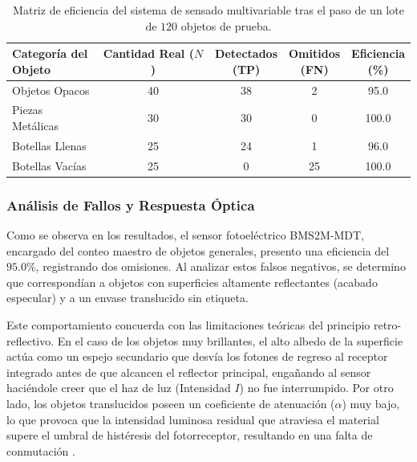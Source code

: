 \documentclass[conference]{IEEEtran}
\begin{document}
\begin{table}[htbp]
    \centering
    \caption{Matriz de eficiencia del sistema de sensado multivariable tras el paso de un lote de $120$ objetos de prueba.}
    \label{tab:matriz_eficiencia}
    \begin{tabular}{lcccc}
        \hline
        \makecell{Categoría del\\Objeto} & \makecell{Cantidad Real\\($N$)} & \makecell{Detectados\\(TP)} & \makecell{Omitidos\\(FN)} & \makecell{Eficiencia\\(\%)} \\
        \hline
        Objetos Opacos & 40 & 38 & 2 & 95.0 \\
        Piezas Metálicas & 30 & 30 & 0 & 100.0 \\
        Botellas Llenas & 25 & 24 & 1 & 96.0 \\
        Botellas Vacías & 25 & 0 & 25 & 100.0\\
        \hline
    \end{tabular}
\end{table}

\subsubsection{Análisis de Fallos y Respuesta Óptica}
Como se observa en los resultados, el sensor fotoeléctrico  BMS2M-MDT, encargado del conteo maestro de objetos generales, presento una eficiencia del $95.0\%$, registrando dos omisiones. Al analizar estos falsos negativos, se determino que correspondían a objetos con superficies altamente reflectantes (acabado especular) y a un envase translucido sin etiqueta. 

Este comportamiento concuerda con las limitaciones teóricas del principio retro-reflectivo. En el caso de los objetos muy brillantes, el alto albedo de la superficie actúa como un espejo secundario que desvía los fotones de regreso al receptor integrado antes de que alcancen el reflector principal, engañando al sensor haciéndole creer que el haz de luz (Intensidad $I$) no fue interrumpido. Por otro lado, los objetos translucidos poseen un coeficiente de atenuación ($\alpha$) muy bajo, lo que provoca que la intensidad luminosa residual que atraviesa el material supere el umbral de histéresis del fotorreceptor, resultando en una falta de conmutación \cite{sensores_9, sensores_11}.
\end{document}
